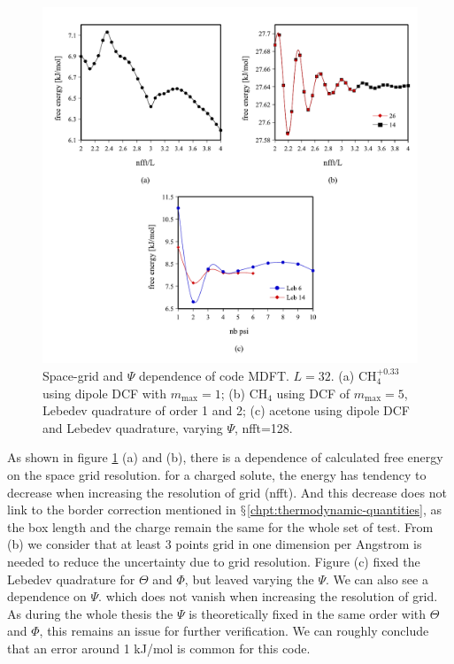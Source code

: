 \begin{figure}[H]
\begin{centering}
\includegraphics[bb=0bp 20bp 567bp 519bp,width=0.75\columnwidth]{_figure/results/grid_reso}
\par\end{centering}
\caption[Space-grid and $\Psi$ dependence of code MDFT]{Space-grid and $\Psi$ dependence of code MDFT. $L=32$. (a) $\mathrm{CH_{4}^{+0.33}}$
using dipole DCF with $m_{\max}=1$; (b) $\mathrm{CH_{4}}$ using
DCF of $m_{\max}=5$, Lebedev quadrature of order 1 and 2; (c) acetone
using dipole DCF and Lebedev quadrature, varying $\Psi$, nfft=128.
\label{fig:Space-grid-and-psi-dependence}}
\end{figure}

As shown in figure \ref{fig:Space-grid-and-psi-dependence} (a) and
(b), there is a dependence of calculated free energy on the space
grid resolution. for a charged solute, the energy has tendency to
decrease when increasing the resolution of grid (nfft). And this decrease
does not link to the border correction mentioned in $\mathsection$\ref{chpt:thermodynamic-quantities},
as the box length and the charge remain the same for the whole set
of test. From (b) we consider that at least 3 points grid in one dimension
per Angstrom is needed to reduce the uncertainty due to grid resolution.
Figure (c) fixed the Lebedev quadrature for $\Theta$ and $\Phi$,
but leaved varying the $\Psi$. We can also see a dependence on $\Psi$.
which does not vanish when increasing the resolution of grid. As during
the whole thesis the $\Psi$ is theoretically fixed in the same order
with $\Theta$ and $\Phi$, this remains an issue for further verification.
We can roughly conclude that an error around 1 kJ/mol is common for
this code.

